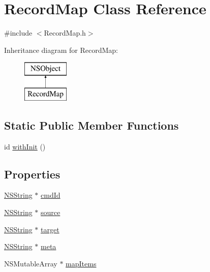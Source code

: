\hypertarget{interface_record_map}{
\section{\-Record\-Map \-Class \-Reference}
\label{interface_record_map}
}


{\ttfamily \#include $<$\-Record\-Map.\-h$>$}

\-Inheritance diagram for \-Record\-Map\-:\begin{figure}[H]
\begin{center}
\leavevmode
\includegraphics[height=2.000000cm]{interface_record_map}
\end{center}
\end{figure}
\subsection*{\-Static \-Public \-Member \-Functions}
\begin{DoxyCompactItemize}
\item 
id \hyperlink{interface_record_map_acdcfed3c6ac6522bb35f4c37bdc22c49}{with\-Init} ()
\end{DoxyCompactItemize}
\subsection*{\-Properties}
\begin{DoxyCompactItemize}
\item 
\hyperlink{class_n_s_string}{\-N\-S\-String} $\ast$ \hyperlink{interface_record_map_abf0c3203e8c28ecf7da0c83a450802be}{cmd\-Id}
\item 
\hyperlink{class_n_s_string}{\-N\-S\-String} $\ast$ \hyperlink{interface_record_map_adc1c74facf55d83e06bd887e2d54b5d9}{source}
\item 
\hyperlink{class_n_s_string}{\-N\-S\-String} $\ast$ \hyperlink{interface_record_map_a723f2d30d0ef569ace1dde005036f577}{target}
\item 
\hyperlink{class_n_s_string}{\-N\-S\-String} $\ast$ \hyperlink{interface_record_map_adc8a627547989263dce8bf0bb05fd0a1}{meta}
\item 
\-N\-S\-Mutable\-Array $\ast$ \hyperlink{interface_record_map_a7aec30cb32e7c3e45035985af1cd5c1f}{map\-Items}
\end{DoxyCompactItemize}


